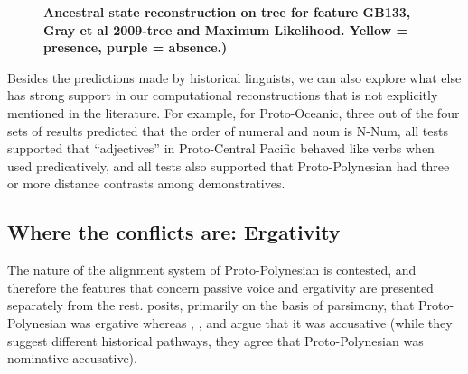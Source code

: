 \documentclass[a4paper,10pt]{article} %
\begin{document}
\newpage
\begin{figure}
\centering
\caption[Ancestral state reconstruction on tree for feature GB133, Gray et al 2009-tree and Maximum Likelihood.]{\textbf{Ancestral state reconstruction on tree for feature GB133, Gray et al 2009-tree and Maximum Likelihood. Yellow = presence, purple = absence.)}}
\label{GB133_tree_ML_gray}
\end{figure}


%
%

Besides the predictions made by historical linguists, we can also explore what else has strong support in our computational reconstructions that is not explicitly mentioned in the literature. For example, for Proto-Oceanic, three out of the four sets of results predicted that the order of numeral and noun is N-Num, all tests supported that ``adjectives'' in Proto-Central Pacific behaved like verbs when used predicatively, and all tests also supported that Proto-Polynesian had three or more distance contrasts among demonstratives. 

\subsection{Where the conflicts are: Ergativity}
The nature of the alignment system of Proto-Polynesian is contested, and therefore the features that concern passive voice and ergativity are presented separately from the rest. \citet{clark1976aspects} posits, primarily on the basis of parsimony, that Proto-Polynesian was ergative whereas \citet{hale_1968}, \citet{hohepa_1967,hohepa_1969}, and \citet{chung1978} argue that it was accusative (while they suggest different historical pathways, they agree that Proto-Polynesian was nominative-accusative).
\end{document}
